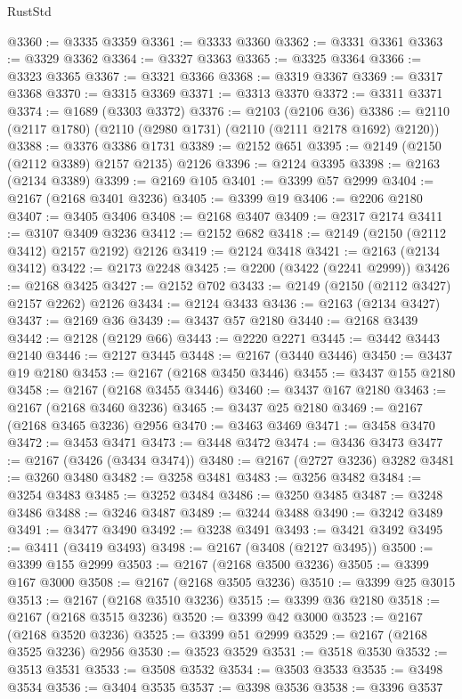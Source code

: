 \begin{lexlean}{RustStd}
\begin{coremodule}
{\begin{coremodule}
{{{{{{{{{{{{{{{{@3360 := @3335 @3359
@3361 := @3333 @3360
@3362 := @3331 @3361
@3363 := @3329 @3362
@3364 := @3327 @3363
@3365 := @3325 @3364
@3366 := @3323 @3365
@3367 := @3321 @3366
@3368 := @3319 @3367
@3369 := @3317 @3368
@3370 := @3315 @3369
@3371 := @3313 @3370
@3372 := @3311 @3371
@3374 := @1689 (@3303 @3372)
@3376 := @2103 (@2106 @36)
@3386 := @2110 (@2117 @1780) (@2110 (@2980 @1731) (@2110 (@2111 @2178 @1692) @2120))
@3388 := @3376 @3386 @1731
@3389 := @2152 @651
@3395 := @2149 (@2150 (@2112 @3389) @2157 @2135) @2126
@3396 := @2124 @3395
@3398 := @2163 (@2134 @3389)
@3399 := @2169 @105
@3401 := @3399 @57 @2999
@3404 := @2167 (@2168 @3401 @3236)
@3405 := @3399 @19
@3406 := @2206 @2180
@3407 := @3405 @3406
@3408 := @2168 @3407
@3409 := @2317 @2174
@3411 := @3107 @3409 @3236
@3412 := @2152 @682
@3418 := @2149 (@2150 (@2112 @3412) @2157 @2192) @2126
@3419 := @2124 @3418
@3421 := @2163 (@2134 @3412)
@3422 := @2173 @2248
@3425 := @2200 (@3422 (@2241 @2999))
@3426 := @2168 @3425
@3427 := @2152 @702
@3433 := @2149 (@2150 (@2112 @3427) @2157 @2262) @2126
@3434 := @2124 @3433
@3436 := @2163 (@2134 @3427)
@3437 := @2169 @36
@3439 := @3437 @57 @2180
@3440 := @2168 @3439
@3442 := @2128 (@2129 @66)
@3443 := @2220 @2271
@3445 := @3442 @3443 @2140
@3446 := @2127 @3445
@3448 := @2167 (@3440 @3446)
@3450 := @3437 @19 @2180
@3453 := @2167 (@2168 @3450 @3446)
@3455 := @3437 @155 @2180
@3458 := @2167 (@2168 @3455 @3446)
@3460 := @3437 @167 @2180
@3463 := @2167 (@2168 @3460 @3236)
@3465 := @3437 @25 @2180
@3469 := @2167 (@2168 @3465 @3236) @2956
@3470 := @3463 @3469
@3471 := @3458 @3470
@3472 := @3453 @3471
@3473 := @3448 @3472
@3474 := @3436 @3473
@3477 := @2167 (@3426 (@3434 @3474))
@3480 := @2167 (@2727 @3236) @3282
@3481 := @3260 @3480
@3482 := @3258 @3481
@3483 := @3256 @3482
@3484 := @3254 @3483
@3485 := @3252 @3484
@3486 := @3250 @3485
@3487 := @3248 @3486
@3488 := @3246 @3487
@3489 := @3244 @3488
@3490 := @3242 @3489
@3491 := @3477 @3490
@3492 := @3238 @3491
@3493 := @3421 @3492
@3495 := @3411 (@3419 @3493)
@3498 := @2167 (@3408 (@2127 @3495))
@3500 := @3399 @155 @2999
@3503 := @2167 (@2168 @3500 @3236)
@3505 := @3399 @167 @3000
@3508 := @2167 (@2168 @3505 @3236)
@3510 := @3399 @25 @3015
@3513 := @2167 (@2168 @3510 @3236)
@3515 := @3399 @36 @2180
@3518 := @2167 (@2168 @3515 @3236)
@3520 := @3399 @42 @3000
@3523 := @2167 (@2168 @3520 @3236)
@3525 := @3399 @51 @2999
@3529 := @2167 (@2168 @3525 @3236) @2956
@3530 := @3523 @3529
@3531 := @3518 @3530
@3532 := @3513 @3531
@3533 := @3508 @3532
@3534 := @3503 @3533
@3535 := @3498 @3534
@3536 := @3404 @3535
@3537 := @3398 @3536
@3538 := @3396 @3537
}}}}}}}}}}}}}}}}
\end{coremodule}}
\end{coremodule}
\end{lexlean}
